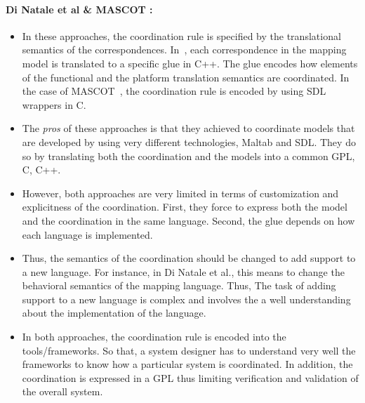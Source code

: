 \paragraph{Di Natale et al \& MASCOT :}
\begin{itemize}
	
	\item In these approaches, the coordination rule is specified by the translational semantics of the correspondences. In~\cite{dinatale}, each correspondence in the mapping model is translated to a specific glue in C++. The glue encodes how elements of the functional and the platform translation semantics are coordinated. In the case of MASCOT~\cite{mascotbib}, the coordination rule is encoded by using SDL wrappers in C.
	
	\item The \emph{pros} of these approaches is that they achieved to coordinate models that are developed by using very different technologies, \ie Maltab and SDL. They do so by translating both the coordination and the models into a common GPL, \ie C, C++.
	  
	\item However, both approaches are very limited in terms of customization and explicitness of the coordination. First, they force to express both the model and the coordination in the same language. Second, the glue depends on how each language is implemented. 
	
	\item Thus, the semantics of the coordination should be changed to add support to a new language. For instance, in Di Natale et al., this means to change the behavioral semantics of the mapping language. Thus, The task of adding support to a new language is complex and involves the a well understanding about the implementation of the language.  
		
	\item In both approaches, the coordination rule is encoded into the tools/frameworks. So that, a system designer has to understand very well the frameworks to know how a particular system is coordinated. In addition, the coordination is expressed in a GPL thus limiting verification and validation of the overall system. 
	
\end{itemize} 

